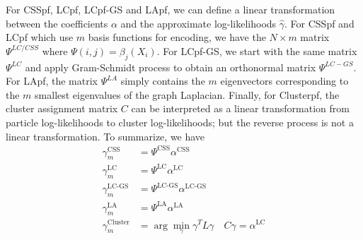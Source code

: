 \documentclass[10pt,letterpaper,final]{article}
\begin{document}
For CSSpf, LCpf, LCpf-GS and LApf, we can define a linear transformation between the coefficients $\alpha$ and the approximate log-likelihoods $\hat{\gamma}$. For CSSpf and LCpf which use $m$ basis functions for encoding, we have the $N\times m$ matrix $\Psi^{LC/CSS}$ where $\Psi(i,j)=\beta_j(X_i)$. For LCpf-GS, we start with the same matrix $\Psi^{LC}$ and apply Gram-Schmidt process to obtain an orthonormal matrix $\Psi^{LC-GS}$. For LApf, the matrix $\Psi^{LA}$ simply contains the $m$ eigenvectors corresponding to the $m$ smallest eigenvalues of the graph Laplacian. Finally, for Clusterpf, the cluster assignment matrix $C$ can be interpreted as a linear transformation from particle log-likelihoods to cluster log-likelihoods; but the reverse process is not a linear transformation. To summarize, we have
\begin{align}
\gamma_m^{\text{CSS}} &= \Psi^{\text{CSS}}\alpha^{\text{CSS}}\\
\gamma_m^{\text{LC}} &= \Psi^{\text{LC}}\alpha^{\text{LC}} \\
\gamma_m^{\text{LC-GS}} &= \Psi^{\text{LC-GS}}\alpha^{\text{LC-GS}} \\
\gamma_m^{\text{LA}} &= \Psi^{\text{LA}}\alpha^{\text{LA}} \\
\gamma_m^{\text{Cluster}} &= \arg \min_{\gamma} \gamma^T L \gamma \quad C\gamma = \alpha^{\text{LC}} 
\end{align}



\end{document}
